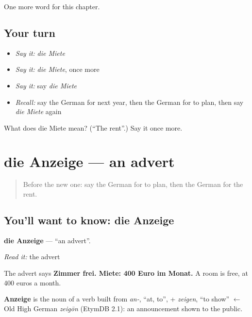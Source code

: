 \begin{grammarlens}[title={What you've built}]
One more word for this chapter.
\end{grammarlens}

\subsection*{Your turn}
\begin{itemize}
\raggedright
  \item \emph{Say it:} \emph{die Miete}
  \item \emph{Say it:} \emph{die Miete}, once more
  \item \emph{Say it:} say \emph{die Miete}
  \item \emph{Recall:} say the German for next year, then the German for to plan, then say \emph{die Miete} again
\end{itemize}

\begin{tcolorbox}[breakable,colback=teal!4,colframe=teal!35!black,title={Before you move on}]
What does die Miete mean? (\textquotedblleft{}The rent\textquotedblright{}.) Say it once more.
\end{tcolorbox}
\section[die Anzeige]{die Anzeige — an advert}

\label{lesson:GE-C143-anzeige}



\begin{quote}
Before the new one: say the German for to plan, then the German for the rent.
\end{quote}

\subsection*{You'll want to know: die Anzeige}
\textbf{die Anzeige} — \textquotedblleft{}an advert\textquotedblright{}.

\emph{Read it:} the advert

The advert says \textbf{Zimmer frei. Miete: 400 Euro im Monat.} A room is free, at 400 euros a month.

\begin{cousinweb}
\textbf{Anzeige} is the noun of a verb built from \emph{an-}, \textquotedblleft{}at, to\textquotedblright{}, + \emph{zeigen}, \textquotedblleft{}to show\textquotedblright{} $\leftarrow$ Old High German \emph{zeigōn} (EtymDB 2.1): an announcement shown to the public.
\end{cousinweb}

